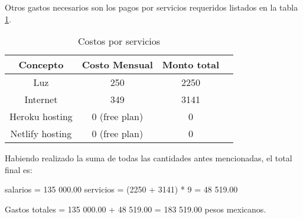 Otros gastos necesarios son los pagos por servicios requeridos listados en la tabla \ref{tab:services_costs}.

\begin{table}[h!]
    \centering
    \begin{tabular}{|c|c|c|c|}
    \hline
        Concepto & Costo Mensual & Monto total \\ \hline
        Luz & 250 & 2250  \\ \hline
        Internet & 349 & 3141 \\ \hline
        Heroku hosting & 0 (free plan) & 0 \\ \hline
        Netlify hosting & 0 (free plan) & 0 \\ \hline
    \end{tabular}
    \caption{Costos por servicios}
    \label{tab:services_costs}
\end{table}

Habiendo realizado la suma de todas las cantidades antes mencionadas, el total final es:

\begin{center}

	salarios = 135 000.00
	servicios = (2250 + 3141) * 9 = 48 519.00

	Gastos totales = 135 000.00 + 48 519.00 = 183 519.00 pesos mexicanos.

\end{center}

